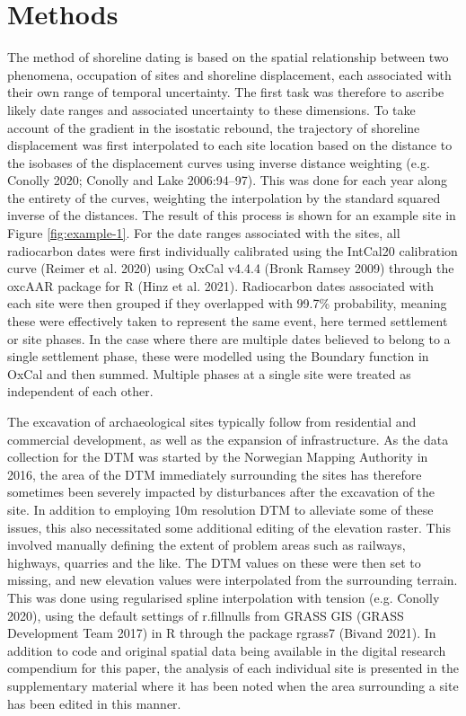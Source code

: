 \documentclass[
]{article}
\begin{document}
\hypertarget{methods}{%
\section{Methods}\label{methods}}

The method of shoreline dating is based on the spatial relationship between two phenomena, occupation of sites and shoreline displacement, each associated with their own range of temporal uncertainty. The first task was therefore to ascribe likely date ranges and associated uncertainty to these dimensions. To take account of the gradient in the isostatic rebound, the trajectory of shoreline displacement was first interpolated to each site location based on the distance to the isobases of the displacement curves using inverse distance weighting (e.g. Conolly 2020; Conolly and Lake 2006:94--97). This was done for each year along the entirety of the curves, weighting the interpolation by the standard squared inverse of the distances. The result of this process is shown for an example site in Figure \ref{fig:example-1}. For the date ranges associated with the sites, all radiocarbon dates were first individually calibrated using the IntCal20 calibration curve (Reimer et al. 2020) using OxCal v4.4.4 (Bronk Ramsey 2009) through the oxcAAR package for R (Hinz et al. 2021). Radiocarbon dates associated with each site were then grouped if they overlapped with 99.7\% probability, meaning these were effectively taken to represent the same event, here termed settlement or site phases. In the case where there are multiple dates believed to belong to a single settlement phase, these were modelled using the Boundary function in OxCal and then summed. Multiple phases at a single site were treated as independent of each other.

The excavation of archaeological sites typically follow from residential and commercial development, as well as the expansion of infrastructure. As the data collection for the DTM was started by the Norwegian Mapping Authority in 2016, the area of the DTM immediately surrounding the sites has therefore sometimes been severely impacted by disturbances after the excavation of the site. In addition to employing 10m resolution DTM to alleviate some of these issues, this also necessitated some additional editing of the elevation raster. This involved manually defining the extent of problem areas such as railways, highways, quarries and the like. The DTM values on these were then set to missing, and new elevation values were interpolated from the surrounding terrain. This was done using regularised spline interpolation with tension (e.g. Conolly 2020), using the default settings of r.fillnulls from GRASS GIS (GRASS Development Team 2017) in R through the package rgrass7 (Bivand 2021). In addition to code and original spatial data being available in the digital research compendium for this paper, the analysis of each individual site is presented in the supplementary material where it has been noted when the area surrounding a site has been edited in this manner.
\end{document}
